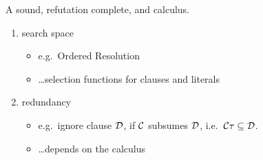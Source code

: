 \begin{goal}
A sound, refutation complete, and  calculus.
\begin{enumerate}
	\item {} search space
	\begin{itemize}
		\item e.g.~Ordered Resolution
		\item \ldots selection functions for clauses and literals
	\end{itemize}
	\item {} redundancy
	\begin{itemize}
		\item e.g.~ignore clause ${\mathcal D}$, if ${\mathcal C}$ subsumes ${\mathcal D}$, i.e.~${\mathcal C}\tau \subseteq {\mathcal D}$.
		\item \ldots depends on the calculus
	\end{itemize}
\end{enumerate}
\end{goal}